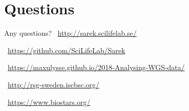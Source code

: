 \documentclass[usepdftitle=false]{beamer}
\begin{document}
{
	\section{Questions}
	\begin{frame}[plain]{Any questions?}
		\vspace{-5cm}
		\small
		\faGlobe\ \url{http://sarek.scilifelab.se/}

		\faGithub\ \url{https://github.com/SciLifeLab/Sarek}

		\faGlobe\ \url{https://maxulysse.github.io/2018-Analysing-WGS-data/}

		\faGlobe\ \url{http://rsg-sweden.iscbsc.org/}

		\faGlobe\ \url{https://www.biostars.org/}

	\end{frame}

}
\end{document}

